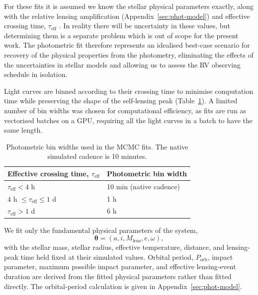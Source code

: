\documentclass[fleqn,usenatbib]{mnras}
\begin{document}
For these fits it is assumed we know the stellar physical parameters exactly, along with the relative lensing amplification (Appendix~\ref{sec:phot-model}) and effective crossing time, $\tau_\mathrm{eff}$ \citep{wiktorowicz_predicting_2021}. In reality there will be uncertainty in these values, but determining them is a separate problem which is out of scope for the present work. The photometric fit therefore represents an idealised best-case scenario for recovery of the physical properties from the photometry, eliminating the effects of the uncertainties in stellar models and allowing us to assess the RV observing schedule in isolation.

Light curves are binned according to their crossing time to minimise computation time while preserving the shape of the self-lensing peak (Table~\ref{tab:photometric-binning}). A limited number of bin widths was chosen for computational efficiency, as fits are run as vectorised batches on a GPU, requiring all the light curves in a batch to have the same length.

\begin{table}
    \centering
    \caption{Photometric bin widths used in the MCMC fits. The native simulated cadence is 10 minutes.}
    \label{tab:photometric-binning}
    \begin{tabular}{ll}
        \hline
        Effective crossing time, $\tau_\mathrm{eff}$ & Photometric bin width   \\
        \hline
        $\tau_\mathrm{eff} < 4$ h                    & 10 min (native cadence) \\
        $4$ h $\leq \tau_\mathrm{eff} \leq 1$ d      & 1 h                     \\
        $\tau_\mathrm{eff} > 1$ d                    & 6 h                     \\
        \hline
    \end{tabular}
\end{table}

We fit only the fundamental physical parameters of the system,
\begin{equation}
    \boldsymbol{\theta} = (a, i, M_\mathrm{lens}, e, \omega),
\end{equation}
with the stellar mass, stellar radius, effective temperature, distance, and lensing-peak time held fixed at their simulated values. Orbital period, $P_\mathrm{orb}$, impact parameter, maximum possible impact parameter, and effective lensing-event duration are derived from the fitted physical parameters rather than fitted directly. The orbital-period calculation is given in Appendix~\ref{sec:phot-model}.
\end{document}
